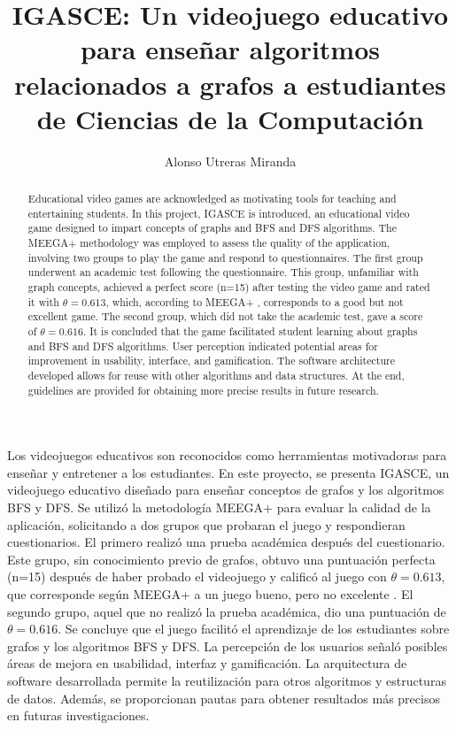 \documentclass{umemoria}
\author{Alonso Utreras Miranda}
\title{IGASCE: Un videojuego educativo para enseñar algoritmos relacionados a grafos a estudiantes de Ciencias de la Computación}
\begin{document}
\frontmatter
\maketitle

\begin{resumen}

Los videojuegos educativos son reconocidos como herramientas motivadoras para enseñar y entretener a los estudiantes. En este proyecto, se presenta IGASCE, un videojuego educativo diseñado para enseñar conceptos de grafos y los algoritmos BFS y DFS. Se utilizó la metodología MEEGA+ \cite{meegaplus} para evaluar la calidad de la aplicación, solicitando a dos grupos que probaran el juego y respondieran cuestionarios. El primero realizó una prueba académica después del cuestionario. Este grupo, sin conocimiento previo de grafos, obtuvo una puntuación perfecta (n=15) después de haber probado el videojuego y calificó al juego con $\theta = 0.613$, que corresponde según MEEGA+ a un juego bueno, pero no excelente \cite{MeegaPlusManual}. El segundo grupo, aquel que no realizó la prueba académica, dio una puntuación de $\theta = 0.616$. Se concluye que el juego facilitó el aprendizaje de los estudiantes sobre grafos y los algoritmos BFS y DFS. La percepción de los usuarios señaló posibles áreas de mejora en usabilidad, interfaz y gamificación. La arquitectura de software desarrollada permite la reutilización para otros algoritmos y estructuras de datos. Además, se proporcionan pautas para obtener resultados más precisos en futuras investigaciones.


\end{resumen}


\begin{abstract}

Educational video games are acknowledged as motivating tools for teaching and entertaining students. In this project, IGASCE is introduced, an educational video game designed to impart concepts of graphs and BFS and DFS algorithms. The MEEGA+ methodology \cite{meegaplus} was employed to assess the quality of the application, involving two groups to play the game and respond to questionnaires. The first group underwent an academic test following the questionnaire. This group, unfamiliar with graph concepts, achieved a perfect score (n=15) after testing the video game and rated it with $\theta = 0.613$, which, according to MEEGA+ \cite{MeegaPlusManual}, corresponds to a good but not excellent game. The second group, which did not take the academic test, gave a score of $\theta = 0.616$. It is concluded that the game facilitated student learning about graphs and BFS and DFS algorithms. User perception indicated potential areas for improvement in usability, interface, and gamification. The software architecture developed allows for reuse with other algorithms and data structures. At the end, guidelines are provided for obtaining more precise results in future research.

\end{abstract}
\end{document}
